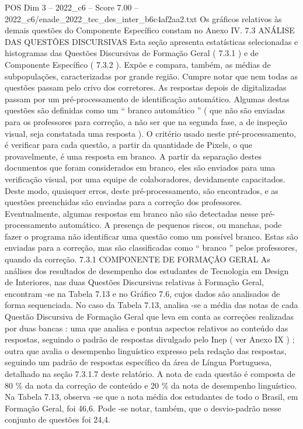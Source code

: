 \begin{textsample}{POS Dim 3 – 2022\_c6 – Score 7.00 – 2022\_c6/enade\_2022\_tec\_des\_inter\_b6c4af2aa2.txt}
Os gráficos relativos às demais questões do Componente Específico constam no Anexo IV. 7.3 ANÁLISE DAS QUESTÕES DISCURSIVAS Esta seção apresenta estatísticas selecionadas e histogramas das Questões Discursivas de Formação Geral ( 7.3.1 ) e de Componente Específico ( 7.3.2 ).
Expõe e compara, também, as médias de subpopulações, caracterizadas por grande região.
Cumpre notar que nem todas as questões passam pelo crivo dos corretores.
As respostas depois de digitalizadas passam por um pré-processamento de identificação automático.
Algumas destas questões são definidas como um “ branco automático ” ( que não são enviadas para os professores para correção, a não ser que na segunda fase, a de inspeção visual, seja constatada uma resposta ).
O critério usado neste pré-processamento, é verificar para cada questão, a partir da quantidade de Pixels, o que provavelmente, é uma resposta em branco.
A partir da separação destes documentos que foram considerados em branco, eles são enviados para uma verificação visual, por uma equipe de colaboradores, devidamente capacitados.
Deste modo, quaisquer erros, deste pré-processamento, são encontrados, e as questões preenchidas são enviadas para a correção dos professores.
Eventualmente, algumas respostas em branco não são detectadas nesse pré-processamento automático.
A presença de pequenos riscos, ou manchas, pode fazer o programa não identificar uma questão como um possível branco.
Estas são enviadas para a correção, mas são classificadas como “ branco ” pelos professores, quando da correção. 7.3.1 COMPONENTE DE FORMAÇÃO GERAL As análises dos resultados de desempenho dos estudantes de Tecnologia em Design de Interiores, nas duas Questões Discursivas relativas à Formação Geral, encontram -se na Tabela 7.13 e no Gráfico 7.6, cujos dados são analisados de forma sequenciada.
No caso da Tabela 7.13, analisa -se a média das notas de cada Questão Discursiva de Formação Geral que leva em conta as correções realizadas por duas bancas : uma que analisa e pontua aspectos relativos ao conteúdo das respostas, seguindo o padrão de respostas divulgado pelo Inep ( ver Anexo IX ) ; outra que avalia o desempenho linguístico expresso pela redação das respostas, seguindo um padrão de respostas específico da área de Língua Portuguesa, detalhado na seção 7.3.1.7 deste relatório.
A nota de cada questão é composta de 80 \% da nota da correção de conteúdo e 20 \% da nota de desempenho linguístico.
Na Tabela 7.13, observa -se que a nota média dos estudantes de todo o Brasil, em Formação Geral, foi 46,6.
Pode -se notar, também, que o desvio-padrão nesse conjunto de questões foi 24,4.

\end{textsample}
